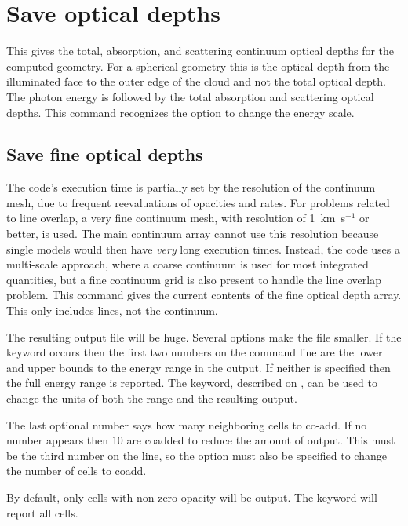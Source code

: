 \section{Save optical depths}

This gives the total, absorption, and scattering continuum optical depths
for the computed geometry.  For a spherical geometry this is the optical
depth from the illuminated face to the outer edge of the cloud and not the
total optical depth.  The photon energy is followed by the total absorption
and scattering optical depths.
This command recognizes the  option
to change the energy scale.

\subsection{Save fine optical depths}

The code's execution time is partially set by the resolution of the
continuum mesh, due to frequent reevaluations of opacities and rates.
For problems related to line overlap, a very fine continuum mesh, with resolution
of 1~km~s$^{-1}$ or better, is used.
The main continuum array cannot use this
resolution because single models would then have \emph{very} long execution times.
Instead, the code uses a multi-scale approach, where a coarse continuum
is used for most integrated quantities, but a fine continuum grid is also
present to handle the line overlap problem.  This command gives the current
contents of the fine optical depth array.  This only includes lines, not
the continuum.

The resulting output file
will be huge.  Several options make the file smaller.
If the keyword  occurs then the first two numbers on
the command line are the lower and upper bounds to the energy range in the
output.  If neither is specified then the full energy range is reported.
The  keyword, described on \pageref{output_units},
can be used to change the units of both the range and the resulting output.

The last optional number says how many neighboring cells to co-add.  If
no number appears then 10 are coadded to reduce the amount of output.
This must be the third number on the line, so the  option
must also be specified to change the number of cells to coadd.

By default, only cells with non-zero opacity will be output.  
The keyword  will report all cells.

